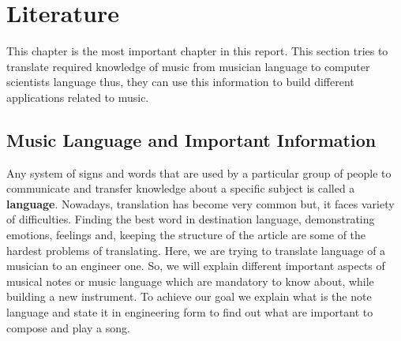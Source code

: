 \chapter{Literature}
This chapter is the most important chapter in this report. This section tries to translate required knowledge of music from musician language to computer scientists language thus, they can use this information to build different applications related to music.
\section{Music Language and Important Information}
Any system of signs and words that are used by a particular group of people to communicate and transfer knowledge about a specific subject is called a \textbf{language}. Nowadays, translation has become very common but, it faces variety of difficulties. Finding the best word in destination language, demonstrating emotions, feelings and, keeping the structure of the article are some of the hardest problems of translating. Here, we are trying to translate language of a musician to an engineer one. So, we will explain different important aspects of musical notes or music language which are mandatory to know about, while building a new instrument. To achieve our goal we explain what is the note language and state it in engineering form to find out what are important to compose and play a song. 


